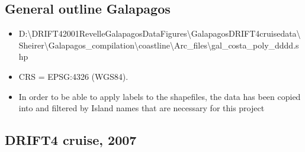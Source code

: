 \documentclass[letterpaper,10pt,english]{sphinxmanual}
\begin{document}
\subsection{General outline Galapagos}
\label{\detokenize{02_folder_hierarchy:general-outline-galapagos}}\begin{itemize}
\item {} 
\sphinxAtStartPar
D:\textbackslash{}DRIFT4\sphinxhyphen{}2001\sphinxhyphen{}Revelle\sphinxhyphen{}Galapagos\sphinxhyphen{}Data\sphinxhyphen{}Figures\textbackslash{}Galapagos\sphinxhyphen{}DRIFT4\sphinxhyphen{}cruise\sphinxhyphen{}data\textbackslash{}Sheirer\textbackslash{}Galapagos\_compilation\textbackslash{}coastline\textbackslash{}Arc\_files\textbackslash{}gal\_costa\_poly\_dddd.shp

\item {} 
\sphinxAtStartPar
CRS = EPSG:4326 (WGS84).

\item {} 
\sphinxAtStartPar
In order to be able to apply labels to the shapefiles, the data has been copied into and filtered by Island names that are necessary for this project

\end{itemize}


\subsection{DRIFT4 cruise, 2007}
\label{\detokenize{02_folder_hierarchy:drift4-cruise-2007}}
\end{document}
